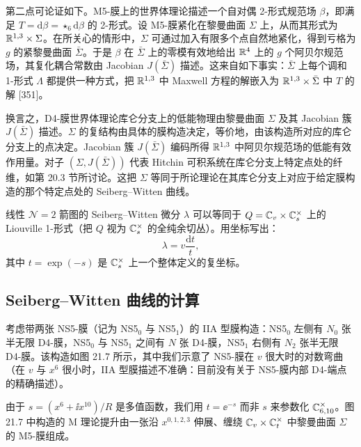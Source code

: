 第二点可论证如下。M5-膜上的世界体理论描述一个自对偶 2-形式规范场 $\beta$，即满足 $T=\mathrm{d}\beta=\star_6\mathrm{d}\beta$ 的 2-形式。设 M5-膜紧化在黎曼曲面 $\Sigma$ 上，从而其形式为 $\mathbb{R}^{1,3}\times\Sigma$。在所关心的情形中，$\Sigma$ 可通过加入有限多个点自然地紧化，得到亏格为 $g$ 的紧黎曼曲面 $\bar\Sigma$。于是 $\beta$ 在 $\bar\Sigma$ 上的零模有效地给出 $\mathbb{R}^4$ 上的 $g$ 个阿贝尔规范场，其复化耦合常数由 Jacobian $J(\bar\Sigma)$ 描述。这来自如下事实：$\bar\Sigma$ 上每个调和 1-形式 $\Lambda$ 都提供一种方式，把 $\mathbb{R}^{1,3}$ 中 Maxwell 方程的解嵌入为 $\mathbb{R}^{1,3}\times\bar\Sigma$ 中 $T$ 的解 [351]。

换言之，D4-膜世界体理论库仑分支上的低能物理由黎曼曲面 $\Sigma$ 及其 Jacobian 簇 $J(\bar\Sigma)$ 描述。$\Sigma$ 的复结构由具体的膜构造决定，等价地，由该构造所对应的库仑分支上的点决定。Jacobian 簇 $J(\bar\Sigma)$ 编码所得 $\mathbb{R}^{1,3}$ 中阿贝尔规范场的低能有效作用量。对子 $(\Sigma,J(\bar\Sigma))$ 代表 Hitchin 可积系统在库仑分支上特定点处的纤维，如第 20.3 节所讨论。这把 $\Sigma$ 等同于所论理论在其库仑分支上对应于给定膜构造的那个特定点处的 Seiberg–Witten 曲线。

\begin{remark}[21.8] 线性 $\mathcal{N}=2$ 箭图的 Seiberg–Witten 微分 $\lambda$ 可以等同于 $Q=\mathbb{C}_v\times\mathbb{C}^\times_s$ 上的 Liouville 1-形式（把 $Q$ 视为 $\mathbb{C}^\times_s$ 的全纯余切丛）。用坐标写出：
\[
\lambda=v\frac{\mathrm{d}t}{t},
\]
其中 $t=\exp(-s)$ 是 $\mathbb{C}^\times_s$ 上一个整体定义的复坐标。\end{remark}

\subsection{Seiberg–Witten 曲线的计算}

考虑带两张 NS5-膜（记为 NS5$_0$ 与 NS5$_1$）的 IIA 型膜构造：NS5$_0$ 左侧有 $N_0$ 张半无限 D4-膜，NS5$_0$ 与 NS5$_1$ 之间有 $N$ 张 D4-膜，NS5$_1$ 右侧有 $N_2$ 张半无限 D4-膜。该构造如图 21.7 所示，其中我们示意了 NS5-膜在 $v$ 很大时的对数弯曲（在 $v$ 与 $x^6$ 很小时，IIA 型膜描述不准确：目前没有关于 NS5-膜内部 D4-端点的精确描述）。

由于 $s=(x^6+\ii x^{10})/R$ 是多值函数，我们用 $t=\ee^{-s}$ 而非 $s$ 来参数化 $\mathbb{C}^\times_{6,10}$。图 21.7 中构造的 M 理论提升由一张沿 $x^{0,1,2,3}$ 伸展、缠绕 $\mathbb{C}_v\times\mathbb{C}^\times_t$ 中黎曼曲面 $\Sigma$ 的 M5-膜组成。


